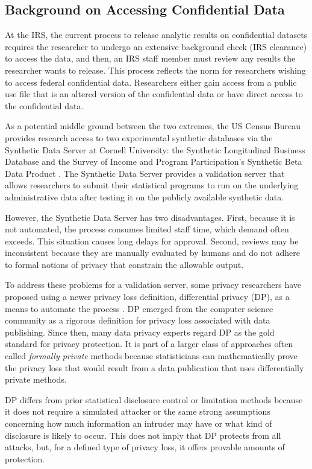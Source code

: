 \subsection{Background on Accessing Confidential Data}\label{subsec:background}
At the IRS, the current process to release analytic results on confidential datasets requires the researcher to undergo an extensive background check (IRS clearance) to access the data, and then, an IRS staff member must review any results the researcher wants to release. This process reflects the norm for researchers wishing to access federal confidential data. Researchers either gain access from a public use file that is an altered version of the confidential data or have direct access to the confidential data.

As a potential middle ground between the two extremes, the US Census Bureau provides research access to two experimental synthetic databases via the Synthetic Data Server at Cornell University: the Synthetic Longitudinal Business Database and the Survey of Income and Program Participation's Synthetic Beta Data Product \citep{benedetto2013creation,drechsler2014synthetic}. The Synthetic Data Server provides a validation server that allows researchers to submit their statistical programs to run on the underlying administrative data after testing it on the publicly available synthetic data.

However, the Synthetic Data Server has two disadvantages. First, because it is not automated, the process consumes limited staff time, which demand often exceeds. This situation causes long delays for approval. Second, reviews may be inconsistent because they are manually evaluated by humans and do not adhere to formal notions of privacy that constrain the allowable output.

To address these problems for a validation server, some privacy researchers have proposed using a newer privacy loss definition, differential privacy (DP), as a means to automate the process \citep{dwork2006calibrating}. DP emerged from the computer science community as a rigorous definition for privacy loss associated with data publishing. Since then, many data privacy experts regard DP as the gold standard for privacy protection. It is part of a larger class of approaches often called \textit{formally private} methods because statisticians can mathematically prove the privacy loss that would result from a data publication that uses differentially private methods.

DP differs from prior statistical disclosure control or limitation methods because it does not require a simulated attacker or the same strong assumptions concerning how much information an intruder may have or what kind of disclosure is likely to occur. This does not imply that DP protects from all attacks, but, for a defined type of privacy loss, it offers provable amounts of protection.

